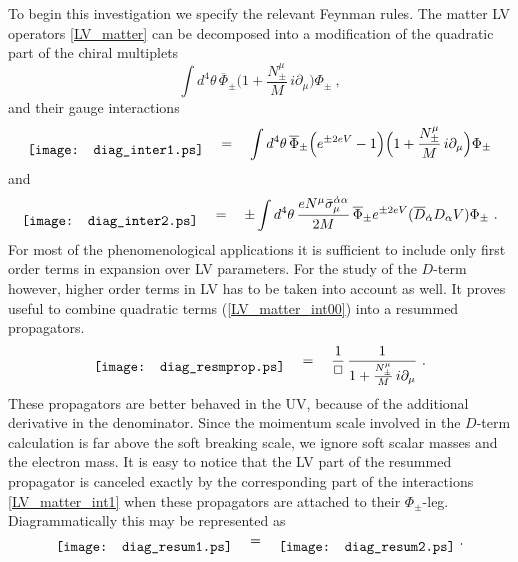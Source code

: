 \documentclass[12pt]{revtex4}
\begin{document}
To begin this investigation we specify the relevant Feynman rules. 
The matter LV operators \eqref{LV_matter} can be decomposed into
a modification of the quadratic part of the chiral multiplets 
\begin{equation} 
\int d^4\theta\, 
\overline{\Phi}_\pm 
\label{LV_matter_int00}
\Big( 1 + \frac{N_\pm^\mu}{M} \, i \partial_\mu  \Big) 
\Phi_\pm~, 
\end{equation}
and their gauge interactions
\begin{equation} 
\raisebox{-1ex}{\texttt{[image: diag\_inter1.ps]}}
\quad = \quad 
\int d^4\theta\, 
\overline{\Phi}_\pm 
\Big(  e^{\pm 2 e V} - 1 \Big) 
\Big( 1 + \frac{N_\pm^\mu}{M} \, i \partial_\mu  \Big) 
\Phi_\pm
\label{LV_matter_int1}
\end{equation}
and 
\begin{equation}
\raisebox{-1ex}{\texttt{[image: diag\_inter2.ps]}}
\quad = \quad 
\pm \int d^4\theta\, 
\frac {e N^\mu \bar\sigma_\mu^{\dot\alpha\alpha}}{2M}\, 
\overline{\Phi}_\pm 
e^{\pm 2eV} 
( \overline{D}_{\dot\alpha} D_\alpha V) 
\Phi_\pm~. 
\label{LV_matter_int2}
\end{equation} 
For most of the phenomenological applications it is sufficient to include 
only first order terms in expansion over LV parameters. For the study of the 
$D$-term however, higher order terms in LV has to be taken into account as well.
It proves useful to combine quadratic terms (\ref{LV_matter_int00}) into a 
resummed  propagators. 
\begin{equation} 
\raisebox{-1ex}{\texttt{[image: diag\_resmprop.ps]}}
\quad = \quad 
\frac 1{\Box}\,  \frac 1{1 +  \frac{ N_\pm^\mu} M \, i\partial_\mu}~. 
\end{equation} 
These propagators are better behaved in the UV, because of the additional 
derivative in the denominator. 
Since the moimentum scale involved in the $D$-term calculation is far above the soft 
breaking scale, we ignore soft scalar masses and the electron mass.
It is easy to notice that the LV part of the resummed propagator  
is canceled exactly by the corresponding part of the interactions \eqref{LV_matter_int1} when 
these propagators are attached to their $\Phi_\pm$-leg. Diagrammatically this may be
represented as  
\begin{equation}
\raisebox{-1ex}{\texttt{[image: diag\_resum1.ps]}}
\quad = \quad 
\raisebox{-1ex}{\texttt{[image: diag\_resum2.ps]}}
~. 
\label{ResummedPropVer}
\end{equation}
\end{document}
